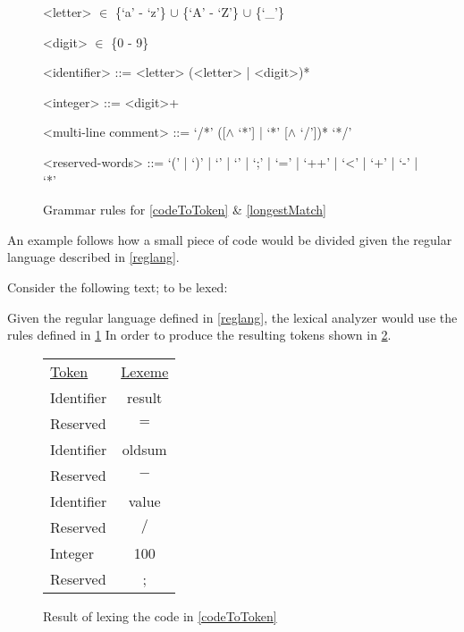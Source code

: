 \begin{figure}[h!]
\begin{center}
\begin{grammar}

<letter>  $\in$ \{`a' - `z'\} $\cup$ \{`A' - `Z'\} $\cup$ \{`_'\}

<digit>  $\in$ \{0 - 9\}

<identifier> ::= <letter> (<letter> | <digit>)* 

<integer> ::= <digit>+

<multi-line comment> ::= `/*' ([$\wedge$ `*'] | `*' [$\wedge$ `/'])* `*/'

<reserved-words> ::= `(' | `)' | `{' | `}' | `;' | `=' | `++' | `<' | `+' | `-' | `*'

\end{grammar}
\caption{Grammar rules for \cref{codeToToken} \& \cref{longestMatch}\label{fig:grammar}}
\end{center}
\end{figure}

An example follows how a small piece of code would be divided given the regular
language described in \cref{reglang}.

\begin{example} \label{codeToToken}$ $\\
Consider the following text; to be lexed:

Given the regular language defined in \cref{reglang}, the lexical analyzer would use the rules defined in \cref{fig:grammar}
In order to produce the resulting tokens shown in \cref{fig:codeToToken}.

\begin{figure}[h!]
\begin{center}
\begin{tabular}{l c}
\underline{Token} & \underline{Lexeme}\\
Identifier & result\\
Reserved & $=$\\
Identifier & oldsum\\
Reserved & $-$\\
Identifier & value\\
Reserved & $/$\\
Integer & 100\\
Reserved & ;
\end{tabular}
\end{center}
\caption{Result of lexing the code in \cref{codeToToken} \label{fig:codeToToken}}
\end{figure}
\end{example}

